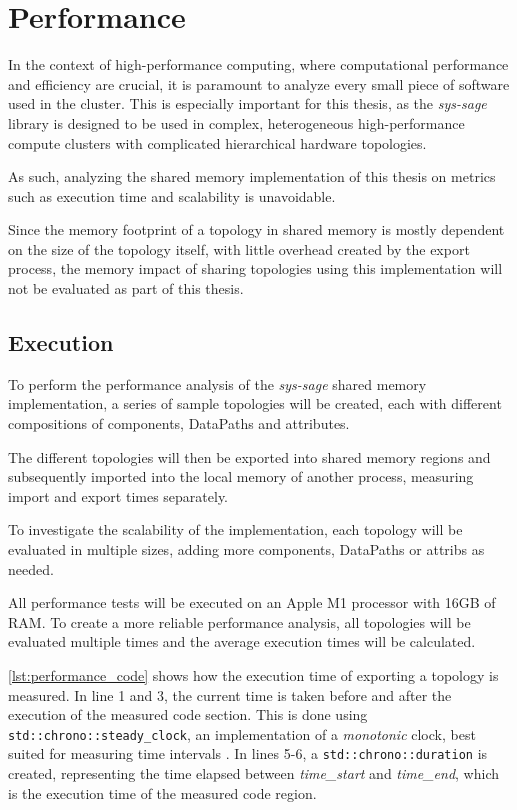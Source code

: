\chapter{Performance}\label{chapter:Performance}
In the context of high-performance computing, where computational performance and efficiency are crucial, it is paramount to analyze every small piece of software used in the cluster.
This is especially important for this thesis, as the \emph{sys-sage} library is designed to be used in complex, heterogeneous high-performance compute clusters with complicated hierarchical hardware topologies.

As such, analyzing the shared memory implementation of this thesis on metrics such as execution time and scalability is unavoidable.

Since the memory footprint of a topology in shared memory is mostly dependent on the size of the topology itself, with little overhead created by the export process,
the memory impact of sharing topologies using this implementation will not be evaluated as part of this thesis.

\section{Execution}
To perform the performance analysis of the \emph{sys-sage} shared memory implementation, a series of sample topologies will be created, each with different compositions of components, DataPaths and attributes.

The different topologies will then be exported into shared memory regions and subsequently imported into the local memory of another process,
measuring import and export times separately.

To investigate the scalability of the implementation, each topology will be evaluated in multiple sizes, adding more components, DataPaths or attribs as needed.

All performance tests will be executed on an Apple M1 processor with 16GB of RAM.
To create a more reliable performance analysis, all topologies will be evaluated multiple times and the average execution times will be calculated.

\autoref{lst:performance_code} shows how the execution time of exporting a topology is measured. In line 1 and 3, the current time is taken before and after the execution of the measured code section.
This is done using \lstinline|std::chrono::steady_clock|, an implementation of a \emph{monotonic} clock, best suited for measuring time intervals \cite{monotonic_clock}.
In lines 5-6, a \lstinline|std::chrono::duration| is created, representing the time elapsed between \emph{time\_start} and \emph{time\_end}, which is the execution time of the measured code region.


